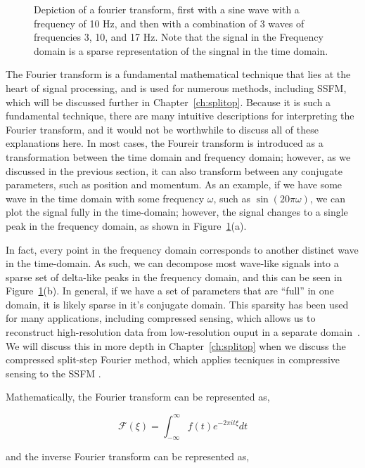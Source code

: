 \begin{figure}
\begin{centering}
\end{centering}

\caption{Depiction of a fourier transform, first with a sine wave with a frequency of 10 Hz, and then with a combination of 3 waves of frequencies 3, 10, and 17 Hz. Note that the signal in the Frequency domain is a sparse representation of the singnal in the time domain.}
\label{fig:FT}
\end{figure}


The Fourier transform is a fundamental mathematical technique that lies at the heart of signal processing, and is used for numerous methods, including SSFM, which will be discussed further in Chapter~\ref{ch:splitop}.
Because it is such a fundamental technique, there are many intuitive descriptions for interpreting the Fourier transform, and it would not be worthwhile to discuss all of these explanations here.
In most cases, the Foureir transform is introduced as a transformation between the time domain and frequency domain; however, as we discussed in the previous section, it can also transform between any conjugate parameters, such as position and momentum.
As an example, if we have some wave in the time domain with some frequency $\omega$, such as $\sin(20\pi\omega)$, we can plot the signal fully in the time-domain; however, the signal changes to a single peak in the frequency domain, as shown in Figure~\ref{fig:FT}(a).

In fact, every point in the frequency domain corresponds to another distinct wave in the time-domain.
As such, we can decompose most wave-like signals into a sparse set of delta-like peaks in the frequency domain, and this can be seen in Figure~\ref{fig:FT}(b).
In general, if we have a set of parameters that are ``full'' in one domain, it is likely sparse in it's conjugate domain.
This sparsity has been used for many applications, including compressed sensing, which allows us to reconstruct high-resolution data from low-resolution ouput in a separate domain~\cite{baraniuk2011}.
We will discuss this in more depth in Chapter~\ref{ch:splitop} when we discuss the compressed split-step Fourier method, which applies tecniques in compressive sensing to the SSFM \cite{bayindir2015}.

Mathematically, the Fourier transform can be represented as,

$$
\mathcal{F}(\xi) = \int_{-\infty}^{\infty}f(t)e^{-2\pi i t \xi}dt
$$

\noindent and the inverse Fourier transform can be represented as,


